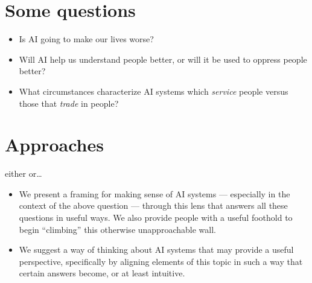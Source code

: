 \documentclass[10pt]{article}
\begin{document}

  
\section{Some questions}
\begin{itemize}
  \item Is AI going to make our lives worse?
  \item Will AI help us understand people better, or will it be used to oppress people better?
  \item What circumstances characterize AI systems which \textit{service} people versus those that \textit{trade} in people?
\end{itemize}

\section{Approaches}
either or\dots
\begin{itemize}
  \item We present a framing for making sense of AI systems
  --- especially in the context of the above question ---
  through this lens that answers all these questions in useful ways.
  We also provide people with a useful foothold to begin ``climbing'' this otherwise unapproachable wall.
  \item We suggest a way of thinking about AI systems that may provide a useful perspective,
  specifically by aligning elements of this topic in such a way that
  certain answers become, or at least intuitive.
\end{itemize}
\end{document}
